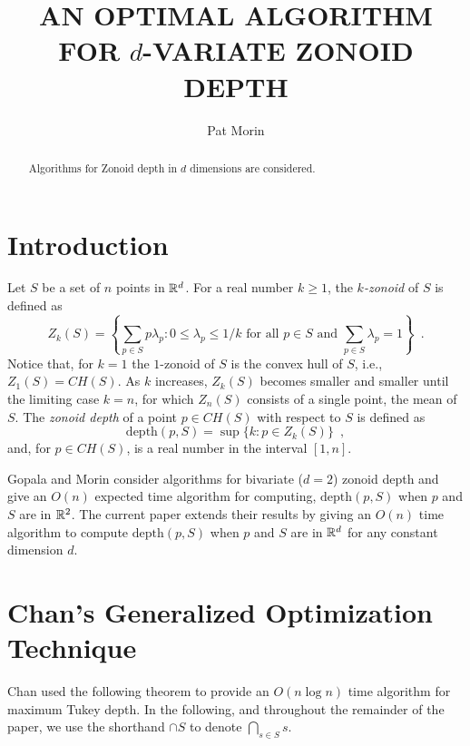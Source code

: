 \documentclass[lotsofwhite]{patmorin}
\title{\MakeUppercase{An Optimal Algorithm
	for} $d$\MakeUppercase{-Variate Zonoid Depth}}
\author{Pat Morin}
\date{}
\newcommand{\CH}{\mathit{CH}}
\newcommand{\depth}{\mathrm{depth}}
\begin{document}
\maketitle
\begin{abstract}
Algorithms for Zonoid depth in $d$ dimensions are considered.
\end{abstract}

\section{Introduction}

Let $S$ be a set of $n$ points in $\mathbb{R}^d$.
For a real number $k\ge 1$, the \emph{$k$-zonoid} of $S$ is defined as 
\[
      Z_k(S) = \left\{\sum_{p\in S}p\lambda_p 
	: \mbox{$0\le \lambda_p \le 1/k$ for all $p\in S$  
	   and $\sum_{p\in S}\lambda_p = 1$}  \right\} \enspace .
\] 
Notice that, for $k=1$ the $1$-zonoid of $S$ is the convex hull of
$S$,  i.e., $Z_1(S)=\CH(S)$.
As $k$ increases, $Z_k(S)$ becomes smaller and smaller until
the limiting case $k=n$, for which $Z_n(S)$ consists of a single point,
the mean of $S$.  The \emph{zonoid depth} of a point
$p\in\CH(S)$ with respect to $S$ is defined as
\[
     \depth(p,S) = \sup\{k : p\in Z_k(S) \} \enspace ,
\]
and, for $p\in\CH(S)$, is a real number in the interval $[1,n]$.

Gopala and Morin \cite{gm06} consider algorithms for bivariate ($d=2$)
zonoid depth and give an $O(n)$ expected time algorithm for computing,
$\depth(p,S)$ when $p$ and $S$ are in $\mathbb{R}^2$.  The current
paper extends their results by giving an $O(n)$ time algorithm to compute
$\depth(p,S)$ when $p$ and $S$ are in $\mathbb{R}^d$ for any constant
dimension $d$.  

\section{Chan's Generalized Optimization Technique}

Chan \cite{c2004} used the following theorem to provide an $O(n\log
n)$ time algorithm for maximum Tukey depth.  In the following, and
throughout the remainder of the paper, we use the shorthand $\cap S$
to denote $\bigcap_{s\in S}s$.
\end{document}
